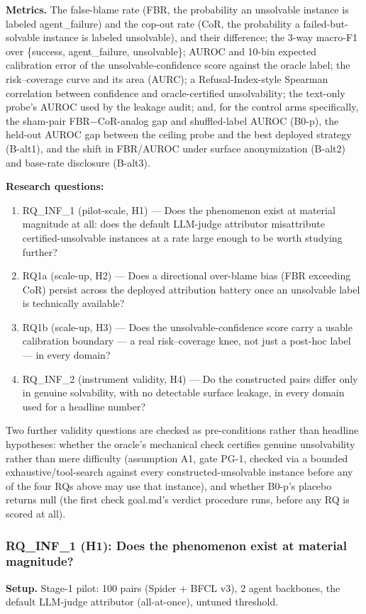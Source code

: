 \documentclass[11pt]{article}
\begin{document}
\textbf{Metrics.} The false-blame rate (FBR, the probability an unsolvable instance is labeled agent\_failure) and the cop-out rate (CoR, the probability a failed-but-solvable instance is labeled unsolvable), and their difference; the 3-way macro-F1 over \{success, agent\_failure, unsolvable\}; AUROC and 10-bin expected calibration error of the unsolvable-confidence score against the oracle label; the risk--coverage curve and its area (AURC); a Refusal-Index-style Spearman correlation between confidence and oracle-certified unsolvability; the text-only probe's AUROC used by the leakage audit; and, for the control arms specifically, the sham-pair FBR$-$CoR-analog gap and shuffled-label AUROC (B0-p), the held-out AUROC gap between the ceiling probe and the best deployed strategy (B-alt1), and the shift in FBR/AUROC under surface anonymization (B-alt2) and base-rate disclosure (B-alt3).

\textbf{Research questions:}
\begin{enumerate}[leftmargin=1.6em]
\item RQ\_INF\_1 (pilot-scale, H1) --- Does the phenomenon exist at material magnitude at all: does the default LLM-judge attributor misattribute certified-unsolvable instances at a rate large enough to be worth studying further?
\item RQ1a (scale-up, H2) --- Does a directional over-blame bias (FBR exceeding CoR) persist across the deployed attribution battery once an unsolvable label is technically available?
\item RQ1b (scale-up, H3) --- Does the unsolvable-confidence score carry a usable calibration boundary --- a real risk--coverage knee, not just a post-hoc label --- in every domain?
\item RQ\_INF\_2 (instrument validity, H4) --- Do the constructed pairs differ only in genuine solvability, with no detectable surface leakage, in every domain used for a headline number?
\end{enumerate}
Two further validity questions are checked as pre-conditions rather than headline hypotheses: whether the oracle's mechanical check certifies genuine unsolvability rather than mere difficulty (assumption A1, gate PG-1, checked via a bounded exhaustive/tool-search against every constructed-unsolvable instance before any of the four RQs above may use that instance), and whether B0-p's placebo returns null (the first check goal.md's verdict procedure runs, before any RQ is scored at all).

\subsubsection{RQ\_INF\_1 (H1): Does the phenomenon exist at material magnitude?}
\textbf{Setup.} Stage-1 pilot: 100 pairs (Spider + BFCL v3), 2 agent backbones, the default LLM-judge attributor (all-at-once), untuned threshold.
\end{document}
